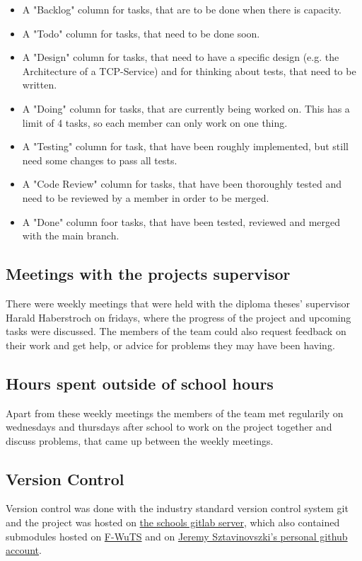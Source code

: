 \begin{itemize}
\item A "Backlog" column for tasks, that are to be done when there is capacity.
\item A "Todo" column for tasks, that need to be done soon.
\item A "Design" column for tasks, that need to have a specific design (e.g. the Architecture of a TCP-Service) and for thinking about tests, that need to be written.
\item A "Doing" column for tasks, that are currently being worked on. This has a limit of 4 tasks, so each member can only work on one thing.
\item A "Testing" column for task, that have been roughly implemented, but still need some changes to pass all tests.
\item A "Code Review" column for tasks, that have been thoroughly tested and need to be reviewed by a member in order to be merged.
\item A "Done" column foor tasks, that have been tested, reviewed and merged with the main branch.
\end{itemize}

\subsection{Meetings with the projects supervisor}
There were weekly meetings that were held with the diploma theses' supervisor Harald Haberstroch on fridays, where the progress of the project and upcoming tasks were discussed.
The members of the team could also request feedback on their work and get help, or advice for problems they may have been having.

\subsection{Hours spent outside of school hours} 
Apart from these weekly meetings the members of the team met regularily on wednesdays and thursdays after school to work on the project together and discuss problems, 
that came up between the weekly meetings.

\subsection{Version Control}
Version control was done with the industry standard version control system git and the project was hosted on \href{https://gitlab.htlwrn.ac.at/Sztavinovszki.Jeremy/RECT}{the schools gitlab server}, 
which also contained submodules hosted on \href{https://github.com/F-WuTS/}{F-WuTS} and on \href{https://github.com/if-loop69420}{Jeremy Sztavinovszki's personal github account}.

